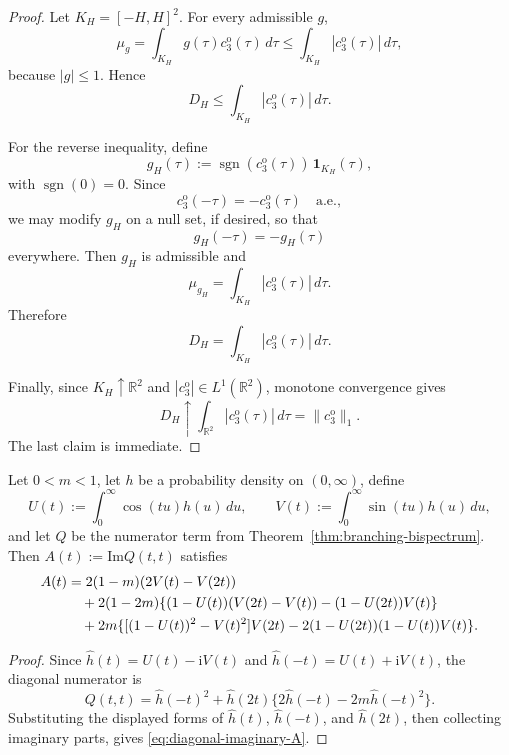\documentclass[aap,press]{apt} \volno{00} \partno{00}
\newcommand{\R}{\mathbb{R}}
\renewcommand{\ii}{\mathrm{i}}
\newcommand{\1}{\mathbf{1}}
\newcommand{\Imm}{\mathrm{Im}}
\numberwithin{equation}{section}
\begin{document}
\begin{proof}
Let $K_H=[-H,H]^2$. For every admissible $g$,
\[
\mu_g
=
\int_{K_H} g(\tau)c_3^{\mathrm o}(\tau)\,d\tau
\le
\int_{K_H}|c_3^{\mathrm o}(\tau)|\,d\tau,
\]
because $|g|\le1$. Hence
\[
D_H\le \int_{K_H}|c_3^{\mathrm o}(\tau)|\,d\tau.
\]

For the reverse inequality, define
\[
g_H(\tau):=\operatorname{sgn}(c_3^{\mathrm o}(\tau))\,\1_{K_H}(\tau),
\]
with $\operatorname{sgn}(0)=0$. Since
\[
c_3^{\mathrm o}(-\tau)=-c_3^{\mathrm o}(\tau)
\quad\text{a.e.},
\]
we may modify $g_H$ on a null set, if desired, so that
\[
g_H(-\tau)=-g_H(\tau)
\]
everywhere. Then $g_H$ is admissible and
\[
\mu_{g_H}
=
\int_{K_H}|c_3^{\mathrm o}(\tau)|\,d\tau.
\]
Therefore
\[
D_H=\int_{K_H}|c_3^{\mathrm o}(\tau)|\,d\tau.
\]

Finally, since $K_H\uparrow\R^2$ and $|c_3^{\mathrm o}|\in L^1(\R^2)$,
monotone convergence gives
\[
D_H\uparrow \int_{\R^2}|c_3^{\mathrm o}(\tau)|\,d\tau
=
\|c_3^{\mathrm o}\|_1.
\]
The last claim is immediate.
\end{proof}



\begin{lem}\label{lem:diagonal-imaginary-part}
Let $0<m<1$, let $h$ be a probability density on $(0,\infty)$, define
\[
U(t):=\int_0^\infty \cos(tu)h(u)\,du,
\qquad
V(t):=\int_0^\infty \sin(tu)h(u)\,du,
\]
and let $Q$ be the numerator term from Theorem~\ref{thm:branching-bispectrum}. Then $A(t):=\Imm Q(t,t)$ satisfies
\begin{align}
A(t)
&=2(1-m)(2V(t)-V(2t)) \notag\\
&\quad+2(1-2m)\{(1-U(t))(V(2t)-V(t))-(1-U(2t))V(t)\} \notag\\
&\quad+2m\{[(1-U(t))^2-V(t)^2]V(2t)-2(1-U(2t))(1-U(t))V(t)\}.
\label{eq:diagonal-imaginary-A}
\end{align}
\end{lem}

\begin{proof}
Since $\widehat h(t)=U(t)-\ii V(t)$ and $\widehat h(-t)=U(t)+\ii V(t)$, the diagonal numerator is
\[
Q(t,t)=\widehat h(-t)^2+\widehat h(2t)\{2\widehat h(-t)-2m\widehat h(-t)^2\}.
\]
Substituting the displayed forms of $\widehat h(t)$, $\widehat h(-t)$, and $\widehat h(2t)$, then collecting imaginary parts, gives \eqref{eq:diagonal-imaginary-A}.
\end{proof}
\end{document}
